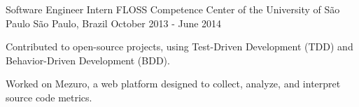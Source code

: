 \begin{cventries}
\cventry
    {Software Engineer Intern} %
    {FLOSS Competence Center of the University of São Paulo} %
    {São Paulo, Brazil} %
    {October 2013 - June 2014} %
    {
      \begin{cvitems} %
        \item {Contributed to open-source projects, using Test-Driven Development (TDD) and Behavior-Driven Development (BDD).}
        \item {Worked on Mezuro, a web platform designed to collect, analyze, and interpret source code metrics.}
      \end{cvitems}
    }


\end{cventries}
